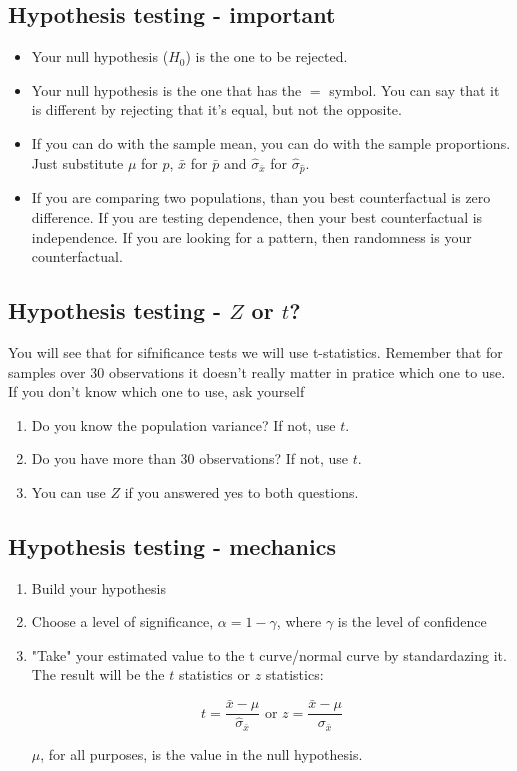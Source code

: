 \documentclass[11pt]{article}
\begin{document}
	\subsection*{Hypothesis testing - important}
	\begin{itemize}
		\item Your null hypothesis ($H_0$) is the one to be rejected.
		\item Your null hypothesis is the one that has the $=$ symbol. You can say that it is different by rejecting that it's equal, but not the opposite.
		\item If you can do with the sample mean, you can do with the sample proportions. Just substitute $\mu$ for $p$, $\bar{x}$ for $\bar{p}$ and $\hat{\sigma}_{\bar{x}}$ for $\hat{\sigma}_{\hat{p}}$.
		\item If you are comparing two populations, than you best counterfactual is zero difference. If you are testing dependence, then your best counterfactual is independence. If you are looking for a pattern, then randomness is your counterfactual.
	\end{itemize}

	\subsection*{Hypothesis testing - $Z$ or $t$?}
	You will see that for sifnificance tests we will use t-statistics. Remember that for samples over 30 observations it doesn't really matter in pratice which one to use. If you don't know which one to use, ask yourself
	\begin{enumerate}
		\item Do you know the population variance? If not, use $t$.
		\item Do you have more than 30 observations? If not, use $t$.
		\item You can use $Z$ if you answered yes to both questions.
	\end{enumerate}


	\subsection*{Hypothesis testing - mechanics}
	\begin{enumerate}
		\item Build your hypothesis
		\item Choose a level of significance, $\alpha = 1 - \gamma$, where $\gamma$ is the level of confidence
		\item "Take" your estimated value to the t curve/normal curve by standardazing it. The result will be the $t$ statistics or $z$ statistics:

		\[t = \frac{\bar{x} - \mu}{\hat{\sigma}_{\bar{x}}} \text{ or } z = \frac{\bar{x} - \mu}{\sigma_{\bar{x}}}\]

		$\mu$, for all purposes, is the value in the null hypothesis. 
	\end{enumerate}
\end{document}

